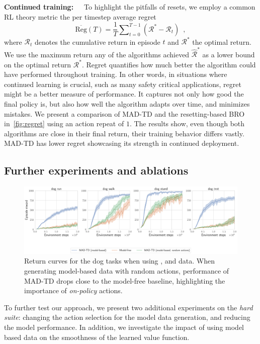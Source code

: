 \textbf{Continued training:}~~~To highlight the pitfalls of resets, we employ a common RL theory metric the per timestep average regret
\begin{equation*}
    \overline{\text{Reg}}(T) = \frac{1}{T} \sum\nolimits_{t=0}^{T-1} \left(\mathcal{R}^* - \mathcal{R}_t\right) \enspace,
\end{equation*}
where $\mathcal{R}_t$ denotes the cumulative return in episode $t$ and $\mathcal{R}^*$ the optimal return. We use the maximum return any of the algorithms achieved $\hat{\mathcal{R}}^*$  as a lower bound on the optimal return $\mathcal{R}^*$. Regret quantifies how much better the algorithm could have performed throughout training. In other words, in situations where continued learning is crucial, such as many safety critical applications, regret might be a better measure of performance. It captures not only how good the final policy is, but also how well the algorithm adapts over time, and minimizes mistakes. We present a comparison of MAD-TD and the resetting-based BRO in~\autoref{fig:regret} using an action repeat of $1$. The results show, even though both algorithms are close in their final return, their training behavior differs vastly. MAD-TD has lower regret showcasing its strength in continued deployment.

\subsection{Further experiments and ablations}
\label{sec:adv_robustness}
\begin{figure}[t]
    \centering
    \includegraphics[width=1.\linewidth]{figures/mad-td/dog_random_actions.pdf}
    \caption{Return curves for the dog tasks when using ,   and   data. When generating model-based data with random actions, performance of MAD-TD drops close to the model-free baseline, highlighting the importance of \emph{on-policy} actions.}
    \label{fig:random_action}
\end{figure}

To further test our approach, we present two additional experiments on the \emph{hard suite}: changing the action selection for the model data generation, and reducing the model performance.
In addition, we investigate the impact of using model based data on the smoothness of the learned value function.

